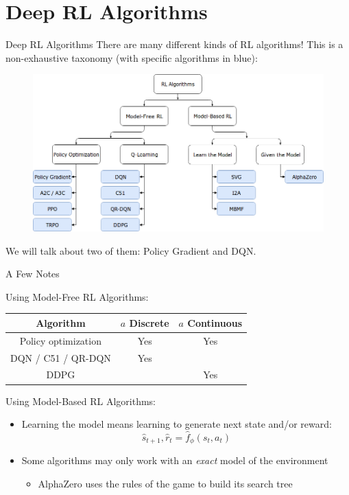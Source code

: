 \documentclass[9pt]{beamer}
\begin{document}
\section{Deep RL Algorithms}

\begin{frame}{Deep RL Algorithms}
There are many different kinds of RL algorithms! This is a non-exhaustive taxonomy (with specific algorithms in blue):
\begin{figure}
\centering
\includegraphics[width=\linewidth]{rl_algorithms}
\end{figure}
We will talk about two of them: Policy Gradient and DQN.
\end{frame}

\begin{frame}{A Few Notes}

Using Model-Free RL Algorithms:
\begin{center}
\begin{tabular}{c|c|c}
Algorithm &  $a$ Discrete &$a$  Continuous \\ \hline
Policy optimization & Yes & Yes \\
DQN / C51 / QR-DQN & Yes & \color{red}{No} \\
DDPG & \color{red}{No} & Yes
\end{tabular}
\end{center}

Using Model-Based RL Algorithms:
\begin{itemize}
\item Learning the model means learning to generate next state and/or reward:
%
\begin{equation*}
\hat{s}_{t+1}, \hat{r}_t = \hat{f}_{\phi}(s_t, a_t)
\end{equation*}
\item Some algorithms may only work with an \textit{exact} model of the environment
\begin{itemize}
\item AlphaZero uses the rules of the game to build its search tree
\end{itemize}
\end{itemize}

\end{frame}
\end{document}

